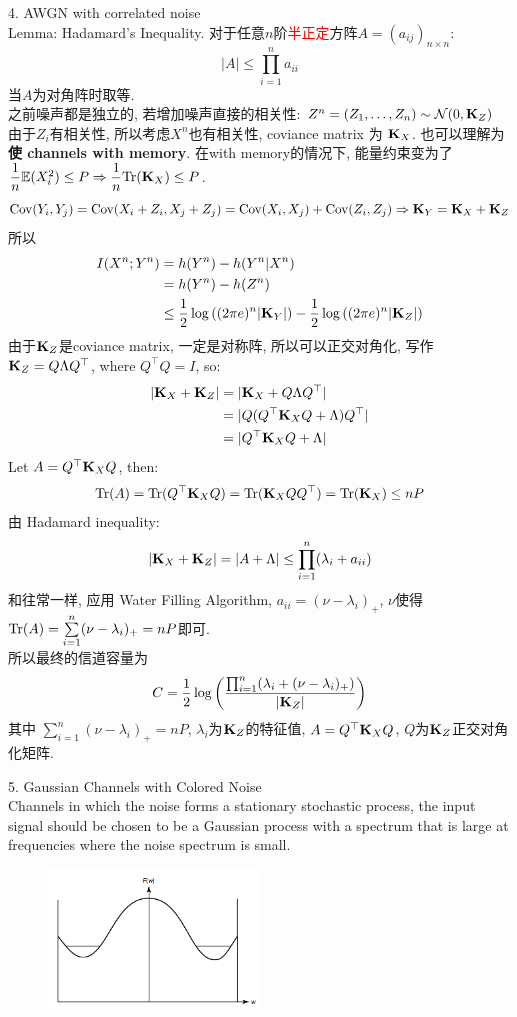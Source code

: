 4. AWGN with correlated noise \\
Lemma: Hadamard's Inequality. 对于任意$n$阶\textcolor{red}{半正定}方阵$A=(a_{ij})_{n\times n}$:
$$|A| \leq \prod_{i=1}^n a_{ii}$$
当$A$为对角阵时取等. \\
之前噪声都是独立的, 若增加噪声直接的相关性: $Z^n=(Z_1,\ldots,Z_n)\sim\mathcal{N}(0,\mathbf{K}_Z)$
由于$Z_i$有相关性, 所以考虑$X^n$也有相关性, coviance matrix 为 $\mathbf{K}_X$. 也可以理解为\textbf{使 channels with memory}. 在with memory的情况下, 能量约束变为了$\dfrac{1}{n}\mathbb{E}(X_i^2)\leq P\Rightarrow \dfrac{1}{n}\text{Tr}(\mathbf{K}_X)\leq P$.
$$\operatorname{Cov}(Y_i,Y_j)=\operatorname{Cov}(X_i+Z_i,X_j+Z_j)=\operatorname{Cov}(X_i,X_j)+\operatorname{Cov}(Z_i,Z_j)\Rightarrow \mathbf{K}_Y=\mathbf{K}_X+\mathbf{K}_Z$$
所以
\begin{align*}
I(X^n;Y^n) &= h(Y^n) - h(Y^n|X^n) \\
&= h(Y^n) - h(Z^n) \\
&\leq \dfrac{1}{2}\log\left((2\pi e)^n|\mathbf{K}_Y|\right) - \dfrac{1}{2}\log\left((2\pi e)^n|\mathbf{K}_Z|\right)
\end{align*}
由于$\mathbf{K}_Z$是coviance matrix, 一定是对称阵, 所以可以正交对角化, 写作 $\mathbf{K}_Z=Q\Lambda Q^{\top}$, where $Q^{\top}Q=I$, so:
\begin{align*}
|\mathbf{K}_X + \mathbf{K}_Z| &= |\mathbf{K}_X + Q\Lambda Q^{\top}| \\
&= |Q(Q^{\top}\mathbf{K}_XQ+\Lambda)Q^{\top}| \\
&= |Q^{\top}\mathbf{K}_XQ+\Lambda|
\end{align*}
Let $A=Q^{\top}\mathbf{K}_XQ$, then:
$$\text{Tr}(A)=\text{Tr}(Q^{\top}\mathbf{K}_XQ)=\text{Tr}(\mathbf{K}_XQQ^{\top})=\text{Tr}(\mathbf{K}_X)\leq nP$$
由 Hadamard inequality:
$$|\mathbf{K}_X + \mathbf{K}_Z| = |A+\Lambda| \leq \prod\limits_{i=1}^n (\lambda_i + a_{ii})$$
和往常一样, 应用 Water Filling Algorithm, $a_{ii}=(\nu-\lambda_i)_+$, $\nu$使得$\text{Tr}(A)=\sum\limits_{i=1}^n (\nu-\lambda_i)_+=nP$即可. \\
所以最终的信道容量为
$$C=\dfrac{1}{2}\log\left(\dfrac{\prod_{i=1}^n (\lambda_i + (\nu-\lambda_i)_+)}{|\mathbf{K}_Z|}\right)$$
其中 $\sum\limits_{i=1}^n (\nu-\lambda_i)_+=nP$, $\lambda_i$为$\mathbf{K}_Z$的特征值, $A=Q^{\top}\mathbf{K}_XQ$, $Q$为$\mathbf{K}_Z$正交对角化矩阵.


5. Gaussian Channels with Colored Noise \\
Channels in which the noise forms a stationary stochastic process, the input signal should be chosen to be a Gaussian process with a spectrum that is large at frequencies where the noise spectrum is small.
\begin{figure}[htbp]
    \centering
    \includegraphics[width=0.5\textwidth]{./figures/chapter7/water_filling_spectrum.png}
\end{figure}

